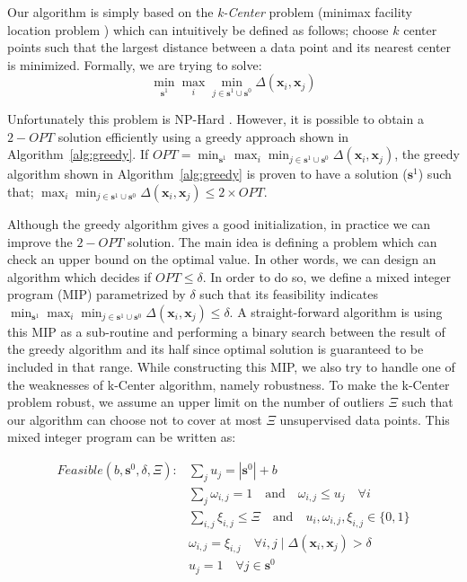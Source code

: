 \documentclass{article}
\begin{document}
Our algorithm is simply based on the \emph{k-Center} problem (minimax facility location problem \cite{facility}) which can intuitively be defined as follows; choose $k$ center points such that the largest distance between a data point and its nearest center is minimized. Formally, we are trying to solve:
\begin{equation}
\min_{\mathbf{s}^1} \max_i \min_{j \in \mathbf{s}^1 \cup \mathbf{s}^0} \Delta(\mathbf{x}_i,\mathbf{x}_j)
\end{equation}



Unfortunately this problem is NP-Hard \cite{cook}. However, it is possible to obtain a $2-OPT$ solution efficiently using a greedy approach shown in  Algorithm~\ref{alg:greedy}. If $OPT=\min_{\mathbf{s}^1} \max_i \min_{j \in \mathbf{s}^1 \cup \mathbf{s}^0} \Delta(\mathbf{x}_i,\mathbf{x}_j)$, the greedy algorithm shown in Algorithm~\ref{alg:greedy} is proven to have a solution ($\mathbf{s}^1$) such that; $ \max_i \min_{j \in \mathbf{s}^1 \cup \mathbf{s}^0} \Delta(\mathbf{x}_i,\mathbf{x}_j) \leq 2 \times OPT$.

Although the greedy algorithm gives a good initialization, in practice we can improve the $2-OPT$ solution. The main idea is defining a problem which can check an upper bound on the optimal value. In other words, we can design an algorithm which decides if $OPT \leq \delta$. In order to do so, we define a mixed integer program (MIP) parametrized by $\delta$ such that its feasibility indicates $\min_{\mathbf{s}^1} \max_i \min_{j \in \mathbf{s}^1 \cup \mathbf{s}^0} \Delta(\mathbf{x}_i,\mathbf{x}_j) \leq \delta$. A straight-forward algorithm is using this MIP as a sub-routine and performing a binary search between the result of the greedy algorithm and its half since optimal solution is guaranteed to be included in that range. While constructing this MIP, we also try to handle one of the weaknesses of k-Center algorithm, namely robustness. To make the k-Center problem robust, we assume an upper limit on the number of outliers $\Xi$ such that our algorithm can choose not to cover at most $\Xi$ unsupervised data points. This mixed integer program can be written as:

\begin{equation}
\begin{aligned}
Feasible(b,\mathbf{s}^0,\delta, \Xi):  &\sum_j  u_j = |\mathbf{s}^0|+ b \\
&\sum_j \omega_{i,j} = 1\quad \text{and} \quad \omega_{i,j} \leq u_j \quad \forall  i \\
   & \sum_{i,j} \xi_{i,j} \leq \Xi \quad \text{and} \quad u_i, \omega_{i,j}, \xi_{i,j} \in \{0,1\} \\
   &\omega_{i,j} = \xi_{i,j} \quad  \forall i,j \mid   \Delta(\mathbf{x}_i,\mathbf{x}_j)  > \delta \\
   &u_j =1 \quad \forall j\in \mathbf{s}^0 \\
\end{aligned}
\label{mipfeasible}
\end{equation}
\end{document}
